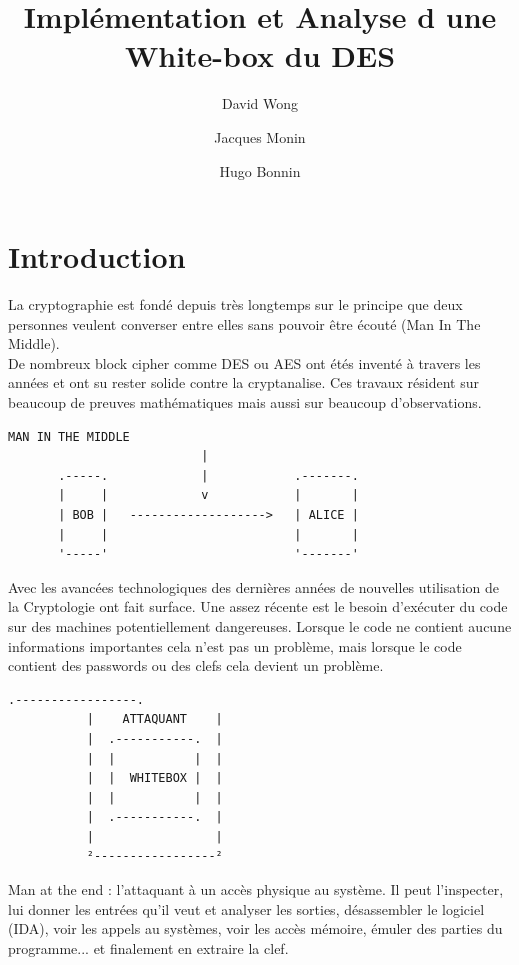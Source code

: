 \documentclass[a4paper,12pt]{article}
\author{David Wong
  \and Jacques Monin
  \and Hugo Bonnin}
\title{Implémentation et Analyse d une White-box du DES}
\begin{document}
\maketitle

\newpage

\tableofcontents

\newpage

\section{Introduction}

La cryptographie est fondé depuis très longtemps sur le principe que deux personnes veulent converser entre elles sans pouvoir être écouté (Man In The Middle).\\
De nombreux block cipher comme DES ou AES ont étés inventé à travers les années et ont su rester solide contre la cryptanalise. Ces travaux résident sur beaucoup de preuves mathématiques mais aussi sur beaucoup d'observations.

\begin{Verbatim}[samepage=true]
                   MAN IN THE MIDDLE
                           |
       .-----.             |            .-------.
       |     |             v            |       |
       | BOB |   ------------------->   | ALICE |
       |     |                          |       |
       '-----'                          '-------'
\end{Verbatim}

Avec les avancées technologiques des dernières années de nouvelles utilisation de la Cryptologie ont fait surface. Une assez récente est le besoin d'exécuter du code sur des machines potentiellement dangereuses. Lorsque le code ne contient aucune informations importantes cela n'est pas un problème, mais lorsque le code contient des passwords ou des clefs cela devient un problème.\\

\begin{Verbatim}[samepage=true]
           .-----------------. 
           |    ATTAQUANT    |
           |  .-----------.  |  
           |  |           |  |  
           |  |  WHITEBOX |  | 
           |  |           |  | 
           |  .-----------.  |
           |                 |
           ²-----------------²
\end{Verbatim}

Man at the end : l'attaquant à un accès physique au système. Il peut l'inspecter, lui donner les entrées qu'il veut et analyser les sorties, désassembler le logiciel (IDA), voir les appels au systèmes, voir les accès mémoire, émuler des parties du programme... et finalement en extraire la clef.\\
\end{document}
